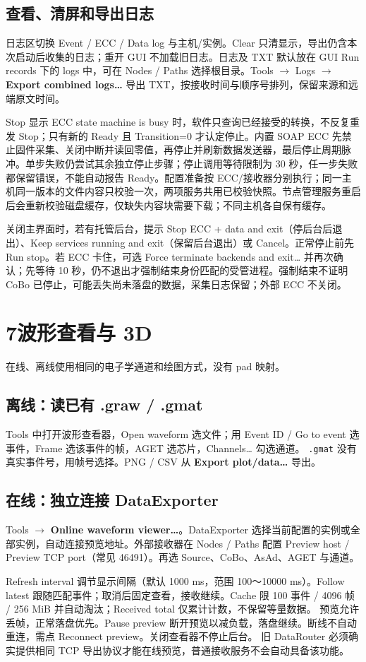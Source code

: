 \documentclass[11pt,a4paper]{article}
\newcommand{\ui}[1]{\textbf{#1}}
\newcommand{\code}[1]{\texttt{#1}}
\newcommand{\note}[1]{\begin{tcolorbox}[colback=light,colframe=accent!40,boxrule=0.5pt,arc=2mm,left=8pt,right=8pt,top=5pt,bottom=5pt]#1\end{tcolorbox}}
\newcommand{\pagehead}[2]{\pdfbookmark[1]{#1}{getdaq-guide-\thepage}\section*{#1}\textcolor{muted}{#2}\par\vspace{3pt}}
\begin{document}
\subsection*{查看、清屏和导出日志}
日志区切换 Event / ECC / Data log 与主机/实例。Clear 只清显示，导出仍含本次启动后收集的日志；重开 GUI 不加载旧日志。日志及 TXT 默认放在 GUI Run records 下的 logs 中，可在 Nodes / Paths 选择根目录。Tools $\rightarrow$ Logs $\rightarrow$ \ui{Export combined logs…} 导出 TXT，按接收时间与顺序号排列，保留来源和远端原文时间。
\note{Stop 显示 ECC state machine is busy 时，软件只查询已经接受的转换，不反复重发 Stop；只有新的 Ready 且 Transition=0 才认定停止。内置 SOAP ECC 先禁止固件采集、关闭中断并读回零值，再停止并刷新数据发送器，最后停止周期脉冲。单步失败仍尝试其余独立停止步骤；停止调用等待限制为 30 秒，任一步失败都保留错误，不能自动报告 Ready。配置准备按 ECC/接收器分别执行；同一主机同一版本的文件内容只校验一次，两项服务共用已校验快照。节点管理服务重启后会重新校验磁盘缓存，仅缺失内容块需要下载；不同主机各自保有缓存。}

\note{关闭主界面时，若有托管后台，提示 Stop ECC + data and exit（停后台后退出）、Keep services running and exit（保留后台退出）或 Cancel。正常停止前先 Run stop。若 ECC 卡住，可选 Force terminate backends and exit… 并再次确认；先等待 10 秒，仍不退出才强制结束身份匹配的受管进程。强制结束不证明 CoBo 已停止，可能丢失尚未落盘的数据，采集日志保留；外部 ECC 不关闭。}

\newpage
\pagehead{7\quad 波形查看与 3D}{在线、离线使用相同的电子学通道和绘图方式，没有 pad 映射。}
\subsection*{离线：读已有 .graw / .gmat}
Tools 中打开波形查看器，Open waveform 选文件；用 Event ID / Go to event 选事件，Frame 选该事件的帧，AGET 选芯片，Channels… 勾选通道。
\code{.gmat} 没有真实事件号，用帧号选择。PNG / CSV 从 \ui{Export plot/data…} 导出。
\subsection*{在线：独立连接 DataExporter}
Tools $\rightarrow$ \ui{Online waveform viewer…}。DataExporter 选择当前配置的实例或全部实例，自动连接预览地址。外部接收器在 Nodes / Paths 配置 Preview host / Preview TCP port（常见 46491）。再选 Source、CoBo、AsAd、AGET 与通道。\par
Refresh interval 调节显示间隔（默认 1000 ms，范围 100～10000 ms）。Follow latest 跟随匹配事件；取消后固定查看，接收继续。Cache 限 100 事件 / 4096 帧 / 256 MiB 并自动淘汰；Received total 仅累计计数，不保留等量数据。
预览允许丢帧，正常落盘优先。Pause preview 断开预览以减负载，落盘继续。断线不自动重连，需点 Reconnect preview。关闭查看器不停止后台。
旧 DataRouter 必须确实提供相同 TCP 导出协议才能在线预览，普通接收服务不会自动具备该功能。
\end{document}
